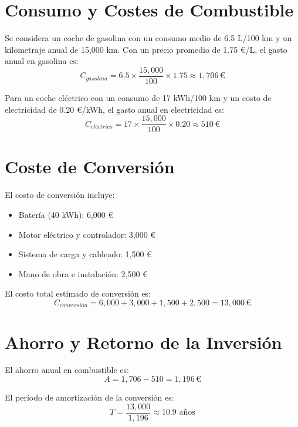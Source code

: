 \documentclass[10pt, a4paper, twoside, twocolumn]{article}
\begin{document}
\begin{Form}
	\section{Consumo y Costes de Combustible}
	Se considera un coche de gasolina con un consumo medio de 6.5 L/100 km y un kilometraje anual de 15,000 km. Con un precio promedio de 1.75 €/L, el gasto anual en gasolina es:
	\begin{equation}
		C_{gasolina} = 6.5 \times \frac{15,000}{100} \times 1.75 \approx 1,706 \,\text{€}
	\end{equation}

	Para un coche eléctrico con un consumo de 17 kWh/100 km y un costo de electricidad de 0.20 €/kWh, el gasto anual en electricidad es:
	\begin{equation}
		C_{eléctrico} = 17 \times \frac{15,000}{100} \times 0.20 \approx 510 \,\text{€}
	\end{equation}

	\section{Coste de Conversión}
	El costo de conversión incluye:
	\begin{itemize}
		\item Batería (40 kWh): 6,000 €
		\item Motor eléctrico y controlador: 3,000 €
		\item Sistema de carga y cableado: 1,500 €
		\item Mano de obra e instalación: 2,500 €
	\end{itemize}
	El costo total estimado de conversión es:
	\begin{equation}
		C_{conversión} = 6,000 + 3,000 + 1,500 + 2,500 = 13,000 \,\text{€}
	\end{equation}

	\section{Ahorro y Retorno de la Inversión}
	El ahorro anual en combustible es:
	\begin{equation}
		A = 1,706 - 510 = 1,196 \,\text{€}
	\end{equation}

	El período de amortización de la conversión es:
	\begin{equation}
		T = \frac{13,000}{1,196} \approx 10.9 \text{ años}
	\end{equation}


\end{Form}
\end{document}
